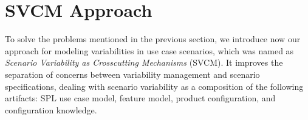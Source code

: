 \documentclass{acm_proc_article-sp}
\begin{document}


%


\section{SVCM Approach}
\label{sec:models}

To solve the problems mentioned in the previous section, we introduce now our
approach for modeling variabilities in use case scenarios, which was named as
\emph{Scenario Variability as Crosscutting Mechanisms} (SVCM). It improves the
separation of concerns between variability management and scenario specifications, dealing with scenario variability as a composition of the
following artifacts: SPL use case model, feature model, product configuration,
and configuration knowledge. 
\end{document}
